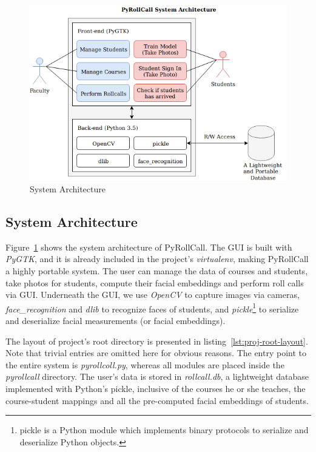 \begin{figure}[!htb]
  \centering
  \includegraphics[width=\linewidth]{figures/system-architecture.png}
  \caption{System Architecture}
  \label{fig:system-architecture}
\end{figure}


\subsection{System Architecture}
Figure~\ref{fig:system-architecture} shows the system architecture of PyRollCall.
The GUI is built with \emph{PyGTK}, and it is already included in the project's \emph{virtualenv}, making
PyRollCall a highly portable system. The user can manage the data of courses and students,
take photos for students, compute their facial embeddings and perform roll calls via GUI\@.
Underneath the GUI, we use \emph{OpenCV} to capture images via cameras, \emph{face\_recognition} and \emph{dlib} to
recognize faces of students, and \emph{pickle}\footnote{pickle is a Python module
  which implements binary protocols to serialize and deserialize Python objects.}
to serialize and deserialize facial measurements (or facial embeddings).
\vspace{0.5cm}

The layout of project's root directory is presented in listing~\ref{lst:proj-root-layout}.
Note that trivial entries are omitted here for obvious reasons.
The entry point to the entire system is \emph{pyrollcoll.py}, whereas all modules are placed
inside the \emph{pyrollcall} directory. The user's data is stored in \emph{rollcall.db},
a lightweight database implemented with Python's pickle, inclusive of the courses he or she
teaches, the course-student mappings and all the pre-computed facial embeddings of students.
\vspace{0.2cm}

